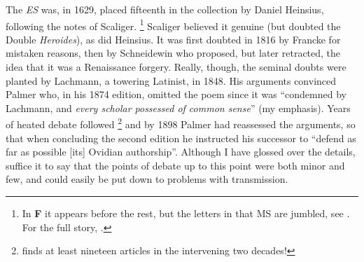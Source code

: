 \documentclass[twocolumn, switch, a4paper]{article} %
\begin{document}
The \emph{ES} was, in 1629, placed fifteenth in the collection by Daniel
Heinsius, following the notes of Scaliger.%
%
    \footnote{In \textbf{F} it appears before the rest, but the letters in
    that MS are jumbled, see . For the full story,
    .}
%
Scaliger believed it genuine (but doubted the Double \emph{Heroides}), as
did Heinsius. It was first doubted in 1816 by Francke for mistaken reasons,
then by Schneidewin who proposed, but later retracted, the idea that it was
a Renaissance forgery. Really, though, the seminal doubts were planted by
Lachmann, a towering Latinist, in 1848. His arguments convinced Palmer who,
in his 1874 edition, omitted the poem since it was ``condemned by Lachmann,
and \emph{every scholar possessed of common sense}'' (my emphasis). Years of
heated debate followed%
%
    \footnote{ finds at least nineteen
    articles in the intervening two decades!}
%
and by 1898 Palmer had reassessed the arguments, so that when concluding the
second edition he instructed his successor to ``defend as far as possible
[its] Ovidian authorship''. Although I have glossed over the details,
suffice it to say that the points of debate up to this point were both minor
and few, and could easily be put down to problems with transmission.
\end{document}

